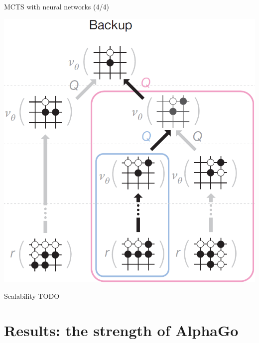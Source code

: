 \documentclass{beamer}
\newcommand{\todo}{\alert{TODO}}
\begin{document}
{    \begin{frame}{MCTS with neural networks (4/4)}
      \begin{center}
        \includegraphics[height=.85\textheight]{../img/MCTS_backup.png}
      \end{center}
    \end{frame}

    \begin{frame}{Scalability}
      \todo
    \end{frame}
  }


  \section{Results: the strength of AlphaGo}
\end{document}
